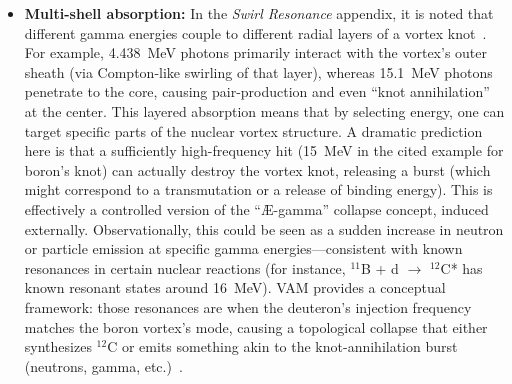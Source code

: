 \documentclass[a4paper,12pt]{article}
\begin{document}
\begin{itemize}
    \item \textbf{Multi-shell absorption:} In the \textit{Swirl Resonance} appendix, it is noted that different gamma energies couple to different radial layers of a vortex knot~\cite{vamcore}. For example, 4.438~MeV photons primarily interact with the vortex's outer sheath (via Compton-like swirling of that layer), whereas 15.1~MeV photons penetrate to the core, causing pair-production and even ``knot annihilation'' at the center. This layered absorption means that by selecting energy, one can target specific parts of the nuclear vortex structure. A dramatic prediction here is that a sufficiently high-frequency hit (15~MeV in the cited example for boron's knot) can actually destroy the vortex knot, releasing a burst (which might correspond to a transmutation or a release of binding energy). This is effectively a controlled version of the ``Æ-gamma'' collapse concept, induced externally. Observationally, this could be seen as a sudden increase in neutron or particle emission at specific gamma energies---consistent with known resonances in certain nuclear reactions (for instance, $^{11}$B + d $\rightarrow$ $^{12}$C* has known resonant states around 16~MeV). VAM provides a conceptual framework: those resonances are when the deuteron's injection frequency matches the boron vortex's mode, causing a topological collapse that either synthesizes $^{12}$C or emits something akin to the knot-annihilation burst (neutrons, gamma, etc.)~\cite{vamcore}.
\end{itemize}
\end{document}

